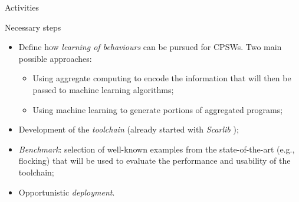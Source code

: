 \documentclass[presentation]{beamer}\mode<presentation>{\usetheme{AMSBolognaFC}}
\begin{document}
\begin{frame}[c]{Activities}

\begin{block}{Necessary steps}
	\begin{itemize}
		\item Define how \emph{learning of behaviours} can be pursued for CPSWs. 
			Two main possible approaches:
			\begin{itemize}
				\item Using aggregate computing to encode the information that will then be 
					passed to machine learning algorithms;
				\item Using machine learning to generate portions of aggregated programs;
			\end{itemize}
		\item Development of the \emph{toolchain} (already started with \emph{Scarlib} \cite{scarlib});
		\item \emph{Benchmark}: selection of well-known examples from the state-of-the-art (e.g., flocking) 
			that will be used to evaluate the performance and usability of the toolchain;
		\item Opportunistic \emph{deployment}.
	\end{itemize}
\end{block}
	
\end{frame}


\end{document}
